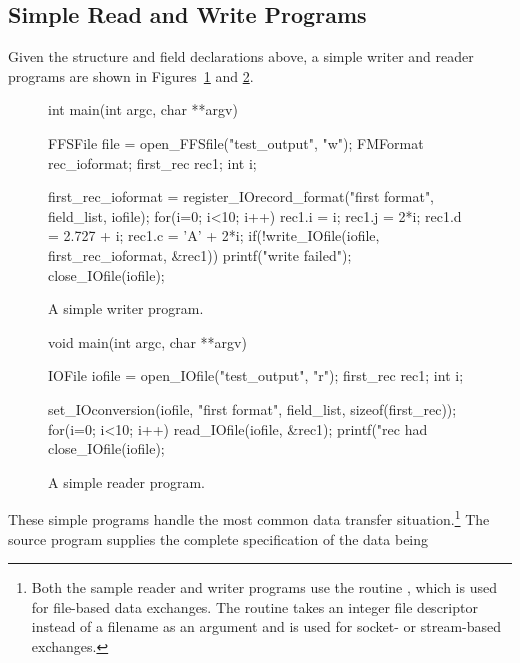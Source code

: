 \subsection{Simple Read and Write Programs\label{sec:simple}}
Given the structure and field declarations above, a simple writer and reader
programs are shown in Figures~\ref{writer} and \ref{reader}.
\begin{figure}[bt]
\begin{Code}
int main(int argc, char **argv)
{
    FFSFile file = open_FFSfile("test_output", "w");
    FMFormat rec_ioformat;
    first_rec rec1;
    int i;

    first_rec_ioformat = register_IOrecord_format("first format", field_list, iofile);
    for(i=0; i<10; i++) {
        rec1.i = i;  rec1.j = 2*i; rec1.d = 2.727 + i; rec1.c = 'A' + 2*i;
        if(!write_IOfile(iofile, first_rec_ioformat, &rec1)) {
           printf("write failed\n");
        }
    }
    close_IOfile(iofile);
}
\end{Code}
\vspace*{-.25in}
\caption{A simple writer program.\label{writer}}

\end{figure}
\begin{figure}[tbh]
\begin{Code}
void main(int argc, char **argv)
{
    IOFile iofile = open_IOfile("test_output", "r");
    first_rec rec1;
    int i;

    set_IOconversion(iofile, "first format", field_list, sizeof(first_rec));
    for(i=0; i<10; i++) {
        read_IOfile(iofile, &rec1);
        printf("rec had %
    }
    close_IOfile(iofile);
}
\end{Code}
\vspace*{-.25in}
\caption{A simple reader program.\label{reader}}
\end{figure}
These simple programs handle the most common data transfer
situation.\footnote{Both the sample reader and writer programs use the routine
, which is used for file-based data exchanges.  The routine
 takes an integer file descriptor instead of a filename as an
argument and is used for socket- or stream-based exchanges.}  
The source program supplies the complete specification of the data being
